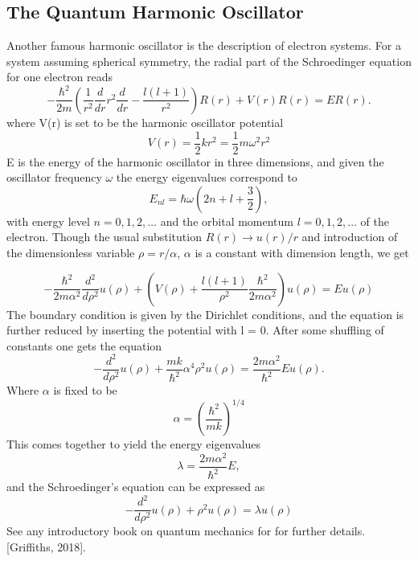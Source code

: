 \documentclass[%
reprint,
amsmath, 
amssymb, 
aps,]{revtex4-1}
\begin{document}
		\subsection{The Quantum Harmonic Oscillator} \noindent 
Another famous harmonic oscillator is the description of electron systems. For a system assuming spherical symmetry, the radial part of the Schroedinger equation for one electron reads
			\begin{equation*}
-\frac{\hbar^2}{2 m} \left ( \frac{1}{r^2} \frac{d}{dr} r^2
\frac{d}{dr} - \frac{l (l + 1)}{r^2} \right )R(r) 
+ V(r) R(r) = E R(r).
			\end{equation*}
where V(r) is set to be the harmonic oscillator potential 
			\begin{equation*}
	V(r) = \dfrac{1}{2}kr^2 = \dfrac{1}{2}m\omega^2r^2
			\end{equation*}
E is the energy of the harmonic oscillator in three dimensions, and given the oscillator frequency $\omega$ the energy eigenvalues correspond to 
			\begin{equation*}
	E_{nl} =  \hbar \omega \left( 2n + l + \frac{3}{2} \right),
			\end{equation*}
with energy level $n=0,1,2,\dots$ and the orbital momentum $l=0,1,2,\dots$ of the electron. Though the usual substitution $R(r) \rightarrow u(r)/r$ and introduction of the dimensionless variable $\rho = r/\alpha$, $\alpha$ is a constant with dimension length, we get

			\begin{equation*}
-\frac{\hbar^2}{2 m \alpha^2} \frac{d^2}{d\rho^2} u(\rho) + \left( V(\rho) + \frac{l (l + 1)}{\rho^2} \frac{\hbar^2}{2 m\alpha^2} \right) u(\rho)  = E u(\rho)
			\end{equation*}
The boundary condition is given by the Dirichlet conditions, and the equation is further reduced by inserting the potential with l = 0. After some shuffling of constants one gets the equation  
			\begin{equation*}
-\frac{d^2}{d\rho^2} u(\rho) 
+ \frac{mk}{\hbar^2} \alpha^4\rho^2u(\rho)  = \frac{2m\alpha^2}{\hbar^2}E u(\rho) .
			\end{equation*}
Where $\alpha$ is fixed to be 
			\begin{equation*}
\alpha = \left(\frac{\hbar^2}{mk}\right)^{1/4}
			\end{equation*}
This comes together to yield the energy eigenvalues 
			\begin{equation*}
\lambda = \frac{2m\alpha^2}{\hbar^2}E,
			\end{equation*}
and the Schroedinger's equation can be expressed as
			\begin{equation}\label{qho}
-\frac{d^2}{d\rho^2} u(\rho) + \rho^2u(\rho)  = \lambda u(\rho)
			\end{equation}
See any introductory book on quantum mechanics for for further details. [Griffiths, 2018]. 
\end{document}
